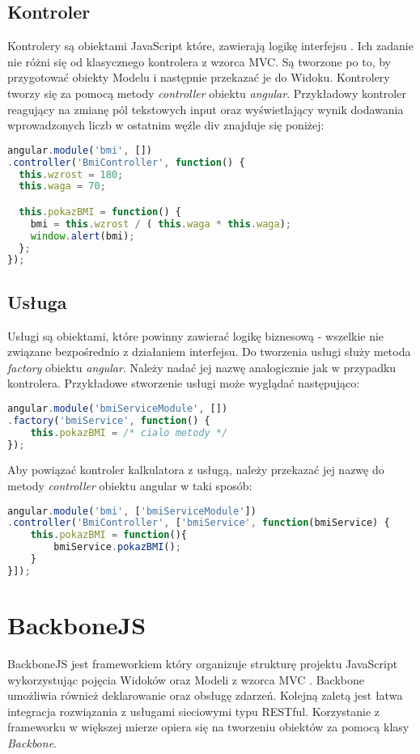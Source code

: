 \subsection{Kontroler}
Kontrolery są obiektami JavaScript które, zawierają logikę interfejsu \cite{angular-book}. Ich zadanie nie różni się od klasycznego kontrolera z wzorca MVC. Są tworzone po to, by przygotować obiekty Modelu i następnie przekazać je do Widoku. Kontrolery tworzy się za pomocą metody \textit{controller} obiektu \textit{angular}. Przykładowy kontroler reagujący na zmianę pól tekstowych input oraz wyświetlający wynik dodawania wprowadzonych liczb w ostatnim węźle div znajduje się poniżej:

\begin{lstlisting}[language=JavaScript]
angular.module('bmi', [])
.controller('BmiController', function() {
  this.wzrost = 180;
  this.waga = 70;

  this.pokazBMI = function() {
  	bmi = this.wzrost / ( this.waga * this.waga);
    window.alert(bmi);
  };
});
\end{lstlisting}


\subsection{Usługa}
Usługi są obiektami, które powinny zawierać logikę biznesową - wszelkie nie związane bezpośrednio z działaniem interfejsu. Do tworzenia usługi służy metoda \textit{factory} obiektu \textit{angular}. Należy nadać jej nazwę analogicznie jak w przypadku kontrolera. Przykładowe stworzenie usługi może wyglądać następująco:
\begin{lstlisting}[language=JavaScript]
angular.module('bmiServiceModule', [])
.factory('bmiService', function() {
	this.pokazBMI = /* cialo metody */
});
\end{lstlisting}

Aby powiązać kontroler kalkulatora z usługą, należy przekazać jej nazwę do metody \textit{controller} obiektu angular w taki sposób:
\begin{lstlisting}[language=JavaScript]
angular.module('bmi', ['bmiServiceModule'])
.controller('BmiController', ['bmiService', function(bmiService) {
	this.pokazBMI = function(){
		bmiService.pokazBMI();
	}
}]);
\end{lstlisting}

\section{BackboneJS}
BackboneJS jest frameworkiem który organizuje strukturę projektu JavaScript wykorzystując pojęcia Widoków oraz Modeli z wzorca MVC \cite{backbonejs}. Backbone umożliwia również deklarowanie oraz obsługę zdarzeń. Kolejną zaletą jest łatwa integracja rozwiązania z usługami sieciowymi typu RESTful. Korzystanie z frameworku w większej mierze opiera się na tworzeniu obiektów za pomocą klasy \textit{Backbone}.

